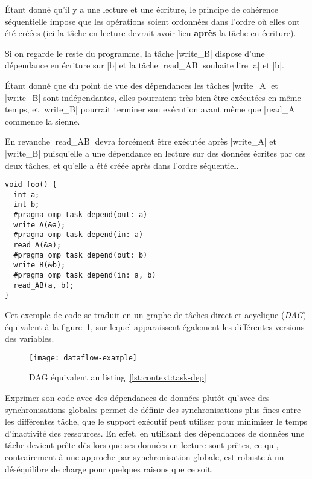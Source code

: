 Étant donné qu'il y a une lecture et une écriture, le principe de cohérence séquentielle impose que les opérations soient ordonnées dans l'ordre où elles ont été créées (ici la tâche en lecture devrait avoir lieu \textbf{après} la tâche en écriture).

Si on regarde le reste du programme, la tâche |write_B| dispose d'une dépendance en écriture sur |b| et la tâche |read_AB| souhaite lire |a| et |b|.

Étant donné que du point de vue des dépendances les tâches |write_A| et |write_B| sont indépendantes, elles pourraient très bien être exécutées en même temps, et |write_B| pourrait terminer son exécution avant même que |read_A| commence la sienne.

En revanche |read_AB| devra forcément être exécutée après |write_A| et |write_B| puisqu'elle a une dépendance en lecture sur des données écrites par ces deux tâches, et qu'elle a été créée après dans l'ordre séquentiel.


\begin{lstlisting}[caption=Synchronisation via des dépendances (OpenMP),label=lst:context:task-dep]
void foo() {
  int a;
  int b;
  #pragma omp task depend(out: a)
  write_A(&a);
  #pragma omp task depend(in: a)
  read_A(&a);
  #pragma omp task depend(out: b)
  write_B(&b);
  #pragma omp task depend(in: a, b)
  read_AB(a, b);
}
\end{lstlisting}

Cet exemple de code se traduit en un graphe de tâches direct et acyclique (\emph{DAG}) équivalent à la figure~\ref{fig:context:dag-dataflow}, sur lequel apparaissent également les différentes versions des variables.

\begin{figure}[ht]
  \centering
  \texttt{[image: dataflow-example]}
  \caption{DAG équivalent au listing~\ref{lst:context:task-dep}}\label{fig:context:dag-dataflow}
\end{figure}

Exprimer son code avec des dépendances de données plutôt qu'avec des synchronisations globales permet de définir des synchronisations plus fines entre les différentes tâche, que le support exécutif peut utiliser pour minimiser le temps d'inactivité des ressources.
En effet, en utilisant des dépendances de données une tâche devient prête dès lors que ses données en lecture sont prêtes, ce qui, contrairement à une approche par synchronisation globale, est robuste à un déséquilibre de charge pour quelques raisons que ce soit.


